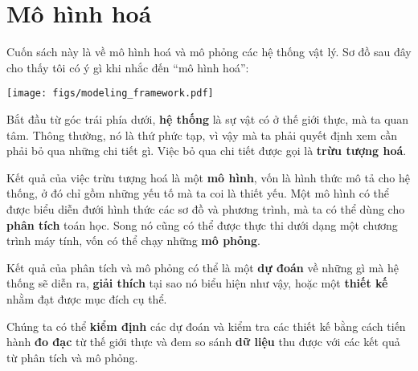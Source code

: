 \documentclass[12pt]{book}
\theoremstyle{exercise}
\begin{document}
\normalsize

\cleardoublepage

\begin{latexonly}


\cleardoublepage

\end{latexonly}

\mainmatter


\chapter{Mô hình hoá}
\label{chap01}

Cuốn sách này là về mô hình hoá và mô phỏng các hệ thống vật lý.
Sơ đồ sau đây cho thấy tôi có ý gì khi nhắc đến ``mô hình hoá'':


\vspace{0.2in}
\centerline{\texttt{[image: figs/modeling\_framework.pdf]}}

Bắt đầu từ góc trái phía dưới, {\bf hệ thống} là sự vật có ở thế giới thực, mà ta quan tâm. Thông thường, nó là thứ phức tạp, vì vậy mà ta phải quyết định xem cần phải bỏ qua những chi tiết gì. Việc bỏ qua chi tiết được gọi là {\bf trừu tượng hoá}.


Kết quả của việc trừu tượng hoá là một {\bf mô hình}, vốn là hình thức mô tả cho hệ thống, ở đó chỉ gồm những yếu tố mà ta coi là thiết yếu. Một mô hình có thể được biểu diễn đưới hình thức các sơ đồ và phương trình, mà ta có thể dùng cho {\bf phân tích} toán học. Song nó cũng có thể được thực thi dưới dạng một chương trình máy tính, vốn có thể chạy những {\bf mô phỏng}.


Kết quả của phân tích và mô phỏng có thể là một {\bf dự đoán} về những gì mà hệ thống sẽ diễn ra, {\bf giải thích} tại sao nó biểu hiện như vậy, hoặc một  {\bf thiết kế} nhằm đạt được mục đích cụ thể.


Chúng ta có thể {\bf kiểm định} các dự đoán và kiểm tra các thiết kế bằng cách tiến hành {\bf đo đạc} từ thế giới thực và đem so sánh {\bf dữ liệu} thu được với các kết quả từ phân tích và mô phỏng.

\end{document}
